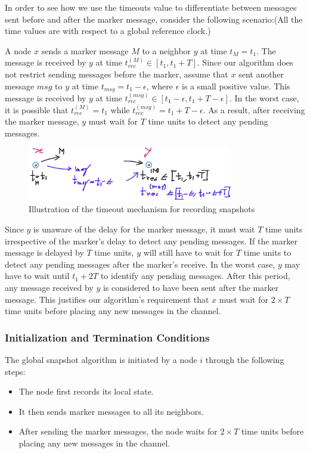 In order to see how we use the timeouts value to differentiate between messages sent before and after the marker message, consider the following scenario:(All the time values are with respect to a global reference clock.)

A node $x$ sends a marker message $M$ to a neighbor $y$ at time $t_M = t_1$. The message is received by $y$ at time $t_{rec}^{(M)} \in [t_1, t_1+T]$. Since our algorithm does not restrict sending messages before the marker, assume that $x$ sent another message $msg$ to $y$ at time $t_{msg} = t_1 - \epsilon$, where $\epsilon$ is a small positive value. This message is received by $y$ at time $t_{rec}^{(msg)} \in [t_1 - \epsilon, t_1 + T - \epsilon]$. In the worst case, it is possible that $t_{rec}^{(M)} = t_1$ while $t_{rec}^{(msg)} = t_1 + T - \epsilon$. As a result, after receiving the marker message, $y$ must wait for $T$ time units to detect any pending messages.

\begin{figure}[h]
    \centering
    \includegraphics[width=0.8\textwidth]{IMG/Q4.jpeg}
    \caption{Illustration of the timeout mechanism for recording snapshots}
    \label{fig:fig1}
\end{figure}

Since $y$ is unaware of the delay for the marker message, it must wait $T$ time units irrespective of the marker's delay to detect any pending messages. If the marker message is delayed by $T$ time units, $y$ will still have to wait for $T$ time units to detect any pending messages after the marker's receive. In the worst case, $y$ may have to wait until $t_1 + 2T$ to identify any pending messages. After this period, any message received by $y$ is considered to have been sent after the marker message. This justifies our algorithm's requirement that $x$ must wait for $2 \times T$ time units before placing any new messages in the channel.


\subsubsection{Initialization and Termination Conditions}

The global snapshot algorithm is initiated by a node \(i\) through the following steps:
\begin{itemize}
    \item The node first records its local state.
    \item It then sends marker messages to all its neighbors.
    \item After sending the marker messages, the node waits for \(2 \times T\) time units before placing any new messages in the channel.
\end{itemize}


